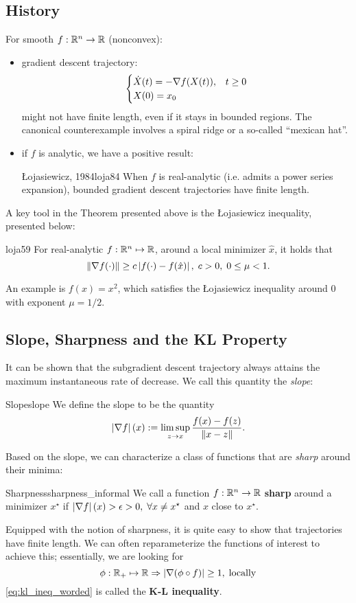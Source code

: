 \subsection{History}
For smooth $f: \mathbb{R}^n \to \mathbb{R}$ (nonconvex):
\begin{itemize}
	\item gradient descent trajectory:
		\[
			\begin{cases}
				\dot{X}(t) = -\nabla f(X(t)), & t \geq 0 \\
				X(0) = x_0 \\
			\end{cases}
		\]
		might not have finite length, even if it stays in bounded regions. The
		canonical counterexample involves a spiral ridge or a so-called
		``mexican hat''.
	\item if $f$ is analytic, we have a positive result:
		\begin{ctheorem}{{\L}ojasiewicz, 1984}{loja84}
			When $f$ is real-analytic (i.e. admits a power series expansion),
			bounded gradient descent trajectories have finite length.
		\end{ctheorem}
\end{itemize}
A key tool in the Theorem presented above is the {\L}ojasiewicz inequality,
presented below:
\begin{ctheorem}{\cite{Loja59}}{loja59}
	For real-analytic $f: \mathbb{R}^n \mapsto \mathbb{R}$, around a local minimizer
	$\hat{x}$, it holds that
	\[
		\left \| \nabla f(\cdot) \right \| \geq c \left| f(\cdot) - f(\hat{x}) \right|, \;
		c > 0, \; 0 \leq \mu < 1.
	\]
\end{ctheorem}
An example is $f(x) = x^2$, which satisfies the {\L}ojasiewicz inequality
around $0$ with exponent $\mu = 1/2$.

\subsection{Slope, Sharpness and the KL Property}
It can be shown that the subgradient descent trajectory always attains the
maximum instantaneous rate of decrease. We call this quantity the
\textit{slope}:
\begin{cdefinition}{Slope}{slope}
	We define the slope to be the quantity
	\[
		\left| \nabla f \right|(x) := \limsup_{z \to x} \frac{f(x) - f(z)}{\left \| x - z \right \|}.
	\]
\end{cdefinition}
Based on the slope, we can characterize a class of functions that are
\textit{sharp} around their minima:
\begin{cdefinition}{Sharpness}{sharpness_informal}
	We call a function $f: \mathbb{R}^n \to \mathbb{R}$ \textbf{sharp} around a minimizer
	$x^{\star}$ if $\left| \nabla f \right|(x) > \epsilon > 0, \; \forall x \neq
	x^{\star}$ and $x$ close to $x^{\star}$.
\end{cdefinition}
Equipped with the notion of sharpness, it is quite easy to show that
trajectories have finite length. We can often reparameterize the functions of
interest to achieve this; essentially, we are looking for
\begin{equation}
	\phi : \mathbb{R}_+ \mapsto \mathbb{R} \Rightarrow
	\left| \nabla(\phi \circ f) \right| \geq 1, \; \text{locally}
	\label{eq:kl_ineq_worded}
\end{equation}
\cref{eq:kl_ineq_worded} is called the \textbf{K-L inequality}.

